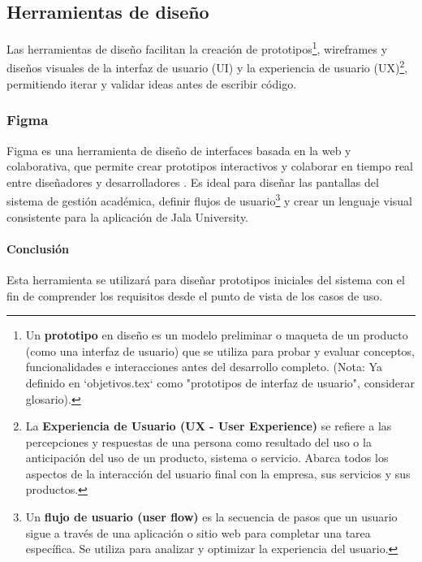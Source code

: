 \subsection{Herramientas de diseño}
Las herramientas de diseño facilitan la creación de prototipos\footnote{Un \textbf{prototipo} en diseño es un modelo preliminar o maqueta de un producto (como una interfaz de usuario) que se utiliza para probar y evaluar conceptos, funcionalidades e interacciones antes del desarrollo completo. (Nota: Ya definido en `objetivos.tex` como "prototipos de interfaz de usuario", considerar glosario).}, wireframes y diseños visuales de la interfaz de usuario (UI) y la experiencia de usuario (UX)\footnote{La \textbf{Experiencia de Usuario (UX - User Experience)} se refiere a las percepciones y respuestas de una persona como resultado del uso o la anticipación del uso de un producto, sistema o servicio.
Abarca todos los aspectos de la interacción del usuario final con la empresa, sus servicios y sus productos.}, permitiendo iterar y validar ideas antes de escribir código.

\subsubsection{Figma}
Figma es una herramienta de diseño de interfaces basada en la web y colaborativa, que permite crear prototipos interactivos y colaborar en tiempo real entre diseñadores y desarrolladores \parencite{Figma}.
Es ideal para diseñar las pantallas del sistema de gestión académica, definir flujos de usuario\footnote{Un \textbf{flujo de usuario (user flow)} es la secuencia de pasos que un usuario sigue a través de una aplicación o sitio web para completar una tarea específica.
Se utiliza para analizar y optimizar la experiencia del usuario.} y crear un lenguaje visual consistente para la aplicación de Jala University.

\paragraph{Conclusión}
Esta herramienta se utilizará para diseñar prototipos iniciales del sistema con el fin de comprender los requisitos desde el punto de vista de los casos de uso.
